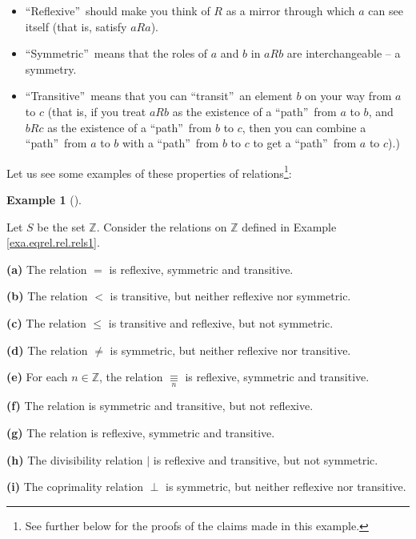 \documentclass[numbers=enddot,12pt,final,onecolumn,notitlepage]{scrartcl}%
\numberwithin{exer}{subsection}
\theoremstyle{definition}
\newtheorem{exam}[theo]{Example}
\newenvironment{example}[1][]
{\begin{exam}[#1]\begin{leftbar}}
{\end{leftbar}\end{exam}}
\begin{document}
\begin{itemize}
\item \textquotedblleft Reflexive\textquotedblright\ should make you think of
$R$ as a mirror through which $a$ can see itself (that is, satisfy $aRa$).

\item \textquotedblleft Symmetric\textquotedblright\ means that the roles of
$a$ and $b$ in $aRb$ are interchangeable -- a symmetry.

\item \textquotedblleft Transitive\textquotedblright\ means that you can
\textquotedblleft transit\textquotedblright\ an element $b$ on your way from
$a$ to $c$ (that is, if you treat $aRb$ as the existence of a
\textquotedblleft path\textquotedblright\ from $a$ to $b$, and $bRc$ as the
existence of a \textquotedblleft path\textquotedblright\ from $b$ to $c$, then
you can combine a \textquotedblleft path\textquotedblright\ from $a$ to $b$
with a \textquotedblleft path\textquotedblright\ from $b$ to $c$ to get a
\textquotedblleft path\textquotedblright\ from $a$ to $c$).)
\end{itemize}

Let us see some examples of these properties of relations\footnote{See further
below for the proofs of the claims made in this example.}:

\begin{example}
\label{exa.eqrel.rel.rst1}Let $S$ be the set $\mathbb{Z}$. Consider the
relations on $\mathbb{Z}$ defined in Example \ref{exa.eqrel.rel.rels1}.

\textbf{(a)} The relation $=$ is reflexive, symmetric and transitive.

\textbf{(b)} The relation $<$ is transitive, but neither reflexive nor symmetric.

\textbf{(c)} The relation $\leq$ is transitive and reflexive, but not symmetric.

\textbf{(d)} The relation $\neq$ is symmetric, but neither reflexive nor transitive.

\textbf{(e)} For each $n\in\mathbb{Z}$, the relation $\underset{n}{\equiv}$ is
reflexive, symmetric and transitive.

\textbf{(f)} The relation  is symmetric and transitive, but not reflexive.

\textbf{(g)} The relation  is reflexive, symmetric and transitive.

\textbf{(h)} The divisibility relation $\mid$ is reflexive and transitive, but
not symmetric.

\textbf{(i)} The coprimality relation $\perp$ is symmetric, but neither
reflexive nor transitive.
\end{example}
\end{document}
